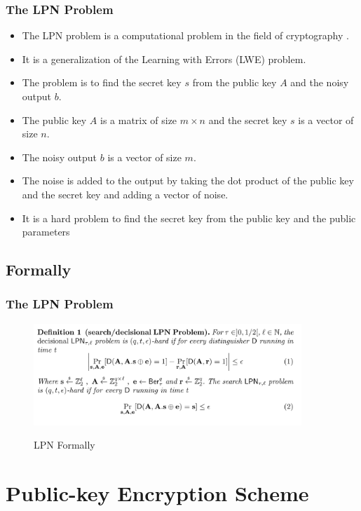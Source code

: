 \documentclass{beamer}
\begin{document}
\begin{frame}
  \frametitle{The LPN Problem}
  \begin{itemize}
    \item The LPN problem is a computational problem in the field of cryptography \cite{LPNluke2022medium}.
    \item It is a generalization of the Learning with Errors (LWE) problem.
    \item The problem is to find the secret key $s$ from the public key $A$ and the noisy output $b$.
    \item The public key $A$ is a matrix of size $m \times n$ and the secret key $s$ is a vector of size $n$.
    \item The noisy output $b$ is a vector of size $m$.
    \item The noise is added to the output by taking the dot product of the public key and the secret key and adding a vector of noise.
    \item It is a hard problem to find the secret key from the public key and the public parameters
  \end{itemize}
\end{frame}


\subsection{Formally}

\begin{frame}
  \frametitle{The LPN Problem}
  \begin{figure}
    \centering
    \caption{LPN Formally}
    \includegraphics[width=0.9\textwidth]{lpn_problem_spec.png}
    \label{fig:lpn_problem_spec}
  \end{figure}
\end{frame}

\section{Public-key Encryption Scheme}
\end{document}
